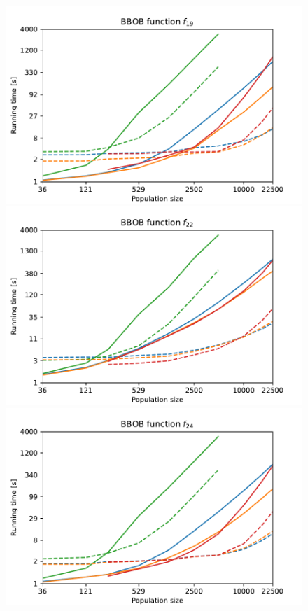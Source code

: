 \begin{figure}[ht!]
    \begin{minipage}[t]{0.32\textwidth}
        \centering
        \includegraphics[width=\textwidth]{img/runs/time_pso2006_fn19_neigh.pdf}
    \end{minipage}
    \hfill
    \begin{minipage}[t]{0.32\textwidth}
        \centering
        \includegraphics[width=\textwidth]{img/runs/time_pso2006_fn22_neigh.pdf}
    \end{minipage}
    \hfill
    \begin{minipage}[t]{0.32\textwidth}
        \centering
        \includegraphics[width=\textwidth]{img/runs/time_pso2006_fn24_neigh.pdf}
    \end{minipage}


\end{figure}
